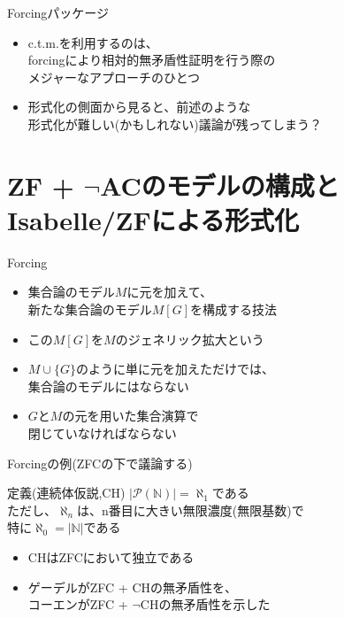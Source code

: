 \documentclass[17pt,aspectratio=169,xcolor=dvipsnames,table,dvipdfmx]{beamer}
\theoremstyle{definition}
\begin{document}
\begin{frame} {Forcingパッケージ}
    \begin{itemize}
        \item c.t.m.を利用するのは、\\
              forcingにより相対的無矛盾性証明を行う際の\\
              メジャーなアプローチのひとつ
        \item 形式化の側面から見ると、前述のような\\形式化が難しい{\small (かもしれない)}議論が残ってしまう？
    \end{itemize}
\end{frame}

\section{ZF + $\lnot$ACのモデルの構成とIsabelle/ZFによる形式化}
\begin{frame} {Forcing}
    \begin{itemize}
        \item 集合論のモデル$M$に元を加えて、\\新たな集合論のモデル$M[G]$を構成する技法
        \item この$M[G]$を$M$のジェネリック拡大という
        \item $M \cup \{ G \}$のように単に元を加えただけでは、\\集合論のモデルにはならない
        \item $G$と$M$の元を用いた集合演算で\\閉じていなければならない
    \end{itemize}
\end{frame}

\begin{frame} {Forcingの例{\small (ZFCの下で議論する)}}
    \begin{block}{定義(連続体仮説,CH)}
        $|\mathcal{P}(\mathbb{N})| = \aleph_1$である \\
        ただし、$\aleph_n$は、n番目に大きい無限濃度(無限基数)で\\
        特に$\aleph_0 = |\mathbb{N}|$である
    \end{block}
    \begin{itemize}
        \item CHはZFCにおいて独立である
        \item ゲーデルがZFC + CHの無矛盾性を、\\
              コーエンがZFC + $\neg$CHの無矛盾性を示した
    \end{itemize}
\end{frame}
\end{document}
